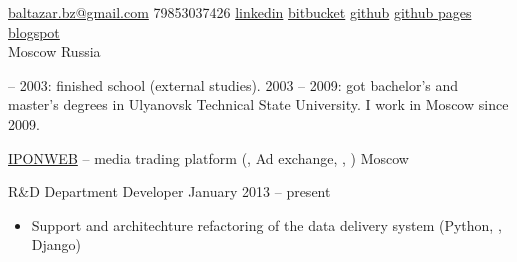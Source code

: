 \documentclass[unicode, 10pt, a4paper, oneside, fleqn]{article}
\begin{document}
\sloppy  %


\nobreakvspace{0.3em}  %

\noindent\href{mailto:baltazar.dot.bz.at.gmail.dot.com}{baltazar.bz\mbox{}@\mbox{}gmail.com}\sbull
\textsmaller{+}79853037426\sbull
\href{http://ru.linkedin.com/pub/yuri-bochkarev/21/3a9/555}{linkedin}
\sbull
\href{https://bitbucket.org/balta2ar}{bitbucket}
\sbull
\href{https://github.com/balta2ar}{github}
\sbull
\href{http://balta2ar.github.com}{github pages}
\sbull
\href{http://baltazar-bz.blogspot.com/}{blogspot}
\\
Moscow\sbull
Russia



 -- 2003: finished school (external studies).
2003 -- 2009: got bachelor's and master's degrees in Ulyanovsk Technical State
University. I work in Moscow since 2009.


\job  %
    {\href{http://www.iponweb.com}{IPONWEB} -- media trading platform
     (, Ad exchange, , )}
    {Moscow}
    {
        \position  %
            {R\&D Department Developer}
            {January 2013 -- present}
            {
                \begin{itemize}
                \item{Support and architechture refactoring of the data delivery
                      system (Python, , Django)}
                \end{itemize}
            }
    }
\end{document}
